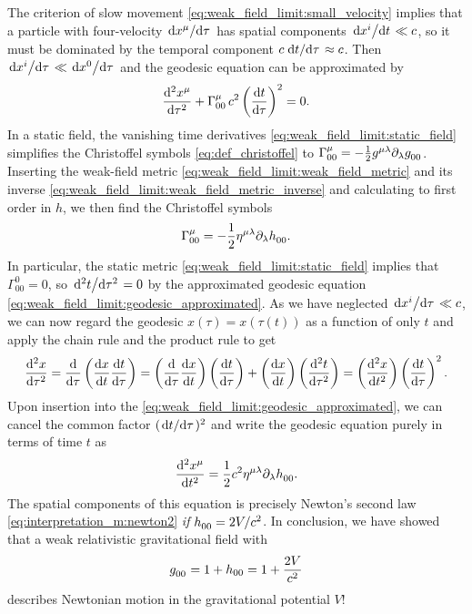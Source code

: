 The criterion of slow movement \cref{eq:weak_field_limit:small_velocity} implies that a particle with four-velocity $\odv{x^\mu}/{\tau}$ has spatial components $\odv{x^i}/{t} \ll c$, so it must be dominated by the temporal component $c \odv{t}/{\tau} \approx c$.
Then $\odv{x^i}/{\tau} \ll \odv{x^0}/{\tau}$ and the geodesic equation can be approximated by
\begin{equation}
	\odv[2]{x^\mu}{\tau} + \Gamma^\mu_{00} \, c^2 \left( \odv{t}{\tau} \right)^2 = 0 .
	\label{eq:weak_field_limit:geodesic_approximated}
\end{equation}
In a static field, the vanishing time derivatives \eqref{eq:weak_field_limit:static_field} simplifies the Christoffel symbols \eqref{eq:def_christoffel} to $\Gamma^\mu_{00} = -\frac{1}{2} g\indices{^\mu^\lambda} \partial_\lambda g\indices{_0_0}$.
Inserting the weak-field metric \eqref{eq:weak_field_limit:weak_field_metric} and its inverse \eqref{eq:weak_field_limit:weak_field_metric_inverse} and calculating to first order in $h$, we then find the Christoffel symbols
\begin{equation}
	\Gamma^\mu_{00} = -\frac{1}{2} \eta\indices{^\mu^\lambda} \partial_\lambda h\indices{_0_0} .
	\label{eq:weak_field_limit:static_christoffel_symbols}
\end{equation}
In particular, the static metric \eqref{eq:weak_field_limit:static_field} implies that $\Gamma^0_{00} = 0$, so $\odv[2]{t}/{\tau} = 0$ by the approximated geodesic equation \eqref{eq:weak_field_limit:geodesic_approximated}.
As we have neglected $\odv{x^i}/{\tau} \ll c$, we can now regard the geodesic $x(\tau) = x(\tau(t))$ as a function of only $t$ and apply the chain rule and the product rule to get 
\begin{equation}
	\odv[2]{x}{\tau} =
	\odv*{\left( \odv{x}{t} \odv{t}{\tau} \right)}{\tau} =
	\left( \odv{}{\tau} \odv{x}{t} \right) \left( \odv{t}{\tau} \right) + \left( \odv{x}{t} \right) \left( \odv[2]{t}{\tau} \right) =
	\left( \odv[2]{x}{t} \right) \left( \odv{t}{\tau} \right)^2 .
\end{equation}
Upon insertion into the \cref{eq:weak_field_limit:geodesic_approximated}, we can cancel the common factor $(\odv{t}/{\tau})^2$ and write the geodesic equation purely in terms of time $t$ as
\begin{equation}
	\odv[2]{x^\mu}{t} = \frac{1}{2} c^2 \eta\indices{^\mu^\lambda} \partial_\lambda h\indices{_0_0} .
\end{equation}
The spatial components of this equation is precisely Newton's second law \eqref{eq:interpretation_m:newton2} \emph{if} $h\indices{_0_0} = 2V/c^2$.
In conclusion, we have showed that a weak relativistic gravitational field with
\begin{equation}
	g\indices{_0_0} = 1 + h_{00} = 1 + \frac{2V}{c^2} 
	\label{eq:weak_field_limit:metric_with_potential}
\end{equation}
describes Newtonian motion in the gravitational potential $V$!

